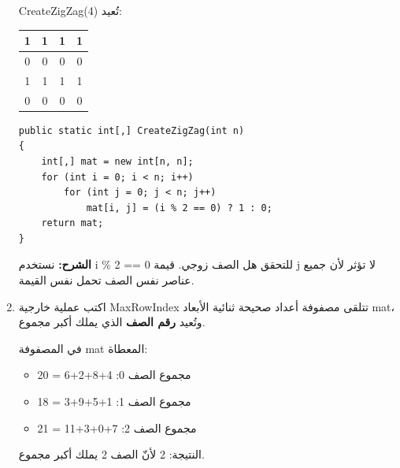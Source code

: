 \documentclass[14pt]{extarticle}
\begin{document}
\begin{enumerate}[itemsep=2em]
\begin{boxExample}
\textenglish{CreateZigZag(4)} تُعيد:
\begin{center}
\begin{english}
\begin{tabular}{|c|c|c|c|}
\hline
1 & 1 & 1 & 1 \\
\hline
0 & 0 & 0 & 0 \\
\hline
1 & 1 & 1 & 1 \\
\hline
0 & 0 & 0 & 0 \\
\hline
\end{tabular}
\end{english}
\end{center}
\end{boxExample}

\ifwithsols
\begin{boxSolution}
\begin{boxCode}
\begin{english}
\begin{verbatim}
public static int[,] CreateZigZag(int n)
{
    int[,] mat = new int[n, n];
    for (int i = 0; i < n; i++)
        for (int j = 0; j < n; j++)
            mat[i, j] = (i % 2 == 0) ? 1 : 0;
    return mat;
}
\end{verbatim}
\end{english}
\end{boxCode}
\textbf{الشرح:} نستخدم \textenglish{i \% 2 == 0} للتحقق هل الصف زوجي. قيمة \textenglish{j} لا تؤثر لأن جميع عناصر نفس الصف تحمل نفس القيمة.
\end{boxSolution}
\fi
\clearpage

\item
اكتب عملية خارجية \textenglish{MaxRowIndex} تتلقى مصفوفة أعداد صحيحة ثنائية الأبعاد \textenglish{mat}، وتُعيد \textbf{رقم الصف} الذي يملك أكبر مجموع.

\begin{boxExample}
في المصفوفة \textenglish{mat} المعطاة:
\begin{itemize}[itemsep=1pt]
    \item مجموع الصف 0: \textenglish{4+8+2+6 = 20}
    \item مجموع الصف 1: \textenglish{1+5+9+3 = 18}
    \item مجموع الصف 2: \textenglish{7+0+3+11 = 21}
\end{itemize}
النتيجة: \textenglish{2} لأنّ الصف 2 يملك أكبر مجموع.
\end{boxExample}


\end{enumerate}
\end{document}
